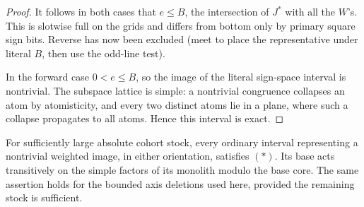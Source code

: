 \begin{proof}
It follows in both cases that \(e\le B\), the intersection of \(J^*\) with all the \(W\)'s. This
is slotwise full on the grids and differs from bottom only by primary square sign bits. Reverse
has now been excluded (meet to place the representative under literal \(B\), then use the odd-line
test).

In the forward case \(0<e\le B\), so the image of the literal sign-space
interval is nontrivial.  The subspace lattice is simple: a nontrivial
congruence collapses an atom by atomisticity, and every two distinct atoms
lie in a plane, where such a collapse propagates to all atoms.  Hence this
interval is exact.
\end{proof}

\begin{proposition}\label{t:weighted-normal}
For sufficiently large absolute cohort stock, every ordinary interval
representing a nontrivial weighted image, in either orientation, satisfies
\((*)\).  Its base acts transitively on the simple factors of its monolith
modulo the base core.  The same assertion holds for the bounded axis deletions
used here, provided the remaining stock is sufficient.
\end{proposition}
